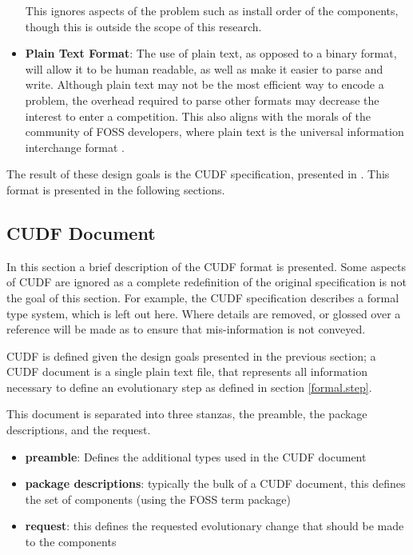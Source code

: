 \begin{itemize}
  This ignores aspects of the problem such as install order of the components, though this is outside the scope of this research.
  \item \textbf{Plain Text Format}:
  The use of plain text, as opposed to a binary format, will allow it to be human readable, as well as make it easier to parse and write.
  Although plain text may not be the most efficient way to encode a problem, the overhead required to parse other formats may decrease the interest to enter a competition.
  This also aligns with the morals of the community of FOSS developers, where plain text is the universal information interchange format \cite{ray2003}.
\end{itemize}

The result of these design goals is the CUDF specification, presented in \cite{treinen2009common}.
This format is presented in the following sections.

\subsection{CUDF Document}
In this section a brief description of the CUDF format is presented.
Some aspects of CUDF are ignored as a complete redefinition of the original specification is not the goal of this section.
For example, the CUDF specification describes a formal type system, which is left out here.
Where details are removed, or glossed over a reference will be made as to ensure that mis-information is not conveyed. 

CUDF is defined given the design goals presented in the previous section;
a CUDF document is a single plain text file, that represents all information necessary to define an evolutionary step as defined in section \ref{formal.step}.

This document is separated into three stanzas, the preamble, the package descriptions, and the request.

\begin{itemize}
  \item \textbf{preamble}: Defines the additional types used in the CUDF document
  \item \textbf{package descriptions}: typically the bulk of a CUDF document, this defines the set of components (using the FOSS term package)
  \item \textbf{request}: this defines the requested evolutionary change that should be made to the components 
\end{itemize}

